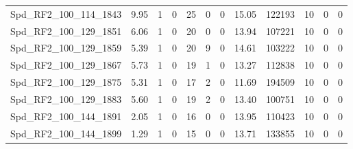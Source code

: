 \begin{longtable}[c]{@{}lrrrrrrrrrrr@{}}
Spd\_RF2\_100\_114\_1843     & 9.95                   & 1                       & 0                       & 25                     & 0                       & 0                       & 15.05                   & 122193                   & 10                       & 0                        & 0                        \\
Spd\_RF2\_100\_129\_1851     & 6.06                   & 1                       & 0                       & 20                     & 0                       & 0                       & 13.94                   & 107221                   & 10                       & 0                        & 0                        \\
Spd\_RF2\_100\_129\_1859     & 5.39                   & 1                       & 0                       & 20                     & 9                       & 0                       & 14.61                   & 103222                   & 10                       & 0                        & 0                        \\
Spd\_RF2\_100\_129\_1867     & 5.73                   & 1                       & 0                       & 19                     & 1                       & 0                       & 13.27                   & 112838                   & 10                       & 0                        & 0                        \\
Spd\_RF2\_100\_129\_1875     & 5.31                   & 1                       & 0                       & 17                     & 2                       & 0                       & 11.69                   & 194509                   & 10                       & 0                        & 0                        \\
Spd\_RF2\_100\_129\_1883     & 5.60                   & 1                       & 0                       & 19                     & 2                       & 0                       & 13.40                   & 100751                   & 10                       & 0                        & 0                        \\
Spd\_RF2\_100\_144\_1891     & 2.05                   & 1                       & 0                       & 16                     & 0                       & 0                       & 13.95                   & 110423                   & 10                       & 0                        & 0                        \\
Spd\_RF2\_100\_144\_1899     & 1.29                   & 1                       & 0                       & 15                     & 0                       & 0                       & 13.71                   & 133855                   & 10                       & 0                        & 0                        \\

\end{longtable}
